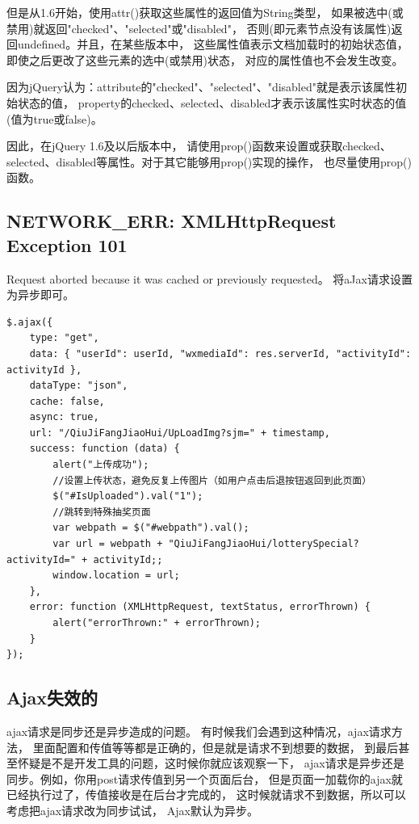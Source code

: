 \documentclass{book}
\begin{document}
但是从1.6开始，使用attr()获取这些属性的返回值为String类型，
如果被选中(或禁用)就返回"checked"、"selected"或"disabled"，
否则(即元素节点没有该属性)返回undefined。并且，在某些版本中，
这些属性值表示文档加载时的初始状态值，即使之后更改了这些元素的选中(或禁用)状态，
对应的属性值也不会发生改变。

因为jQuery认为：attribute的"checked"、"selected"、"disabled"就是表示该属性初始状态的值，
property的checked、selected、disabled才表示该属性实时状态的值(值为true或false)。

因此，在jQuery 1.6及以后版本中，
请使用prop()函数来设置或获取checked、selected、disabled等属性。对于其它能够用prop()实现的操作，
也尽量使用prop()函数。

\subsection{NETWORK\_ERR: XMLHttpRequest Exception 101}

Request aborted because it was cached or previously requested。
将aJax请求设置为异步即可。

\begin{lstlisting}[language=VBScript]
$.ajax({
	type: "get",
	data: { "userId": userId, "wxmediaId": res.serverId, "activityId": activityId },
	dataType: "json",
	cache: false,
	async: true,
	url: "/QiuJiFangJiaoHui/UpLoadImg?sjm=" + timestamp,
	success: function (data) {
		alert("上传成功");
		//设置上传状态，避免反复上传图片（如用户点击后退按钮返回到此页面）
		$("#IsUploaded").val("1");
		//跳转到特殊抽奖页面
		var webpath = $("#webpath").val();
		var url = webpath + "QiuJiFangJiaoHui/lotterySpecial?activityId=" + activityId;;
		window.location = url;
	},
	error: function (XMLHttpRequest, textStatus, errorThrown) {
		alert("errorThrown:" + errorThrown);
	}
});
\end{lstlisting}

\subsection{Ajax失效的}

ajax请求是同步还是异步造成的问题。
有时候我们会遇到这种情况，ajax请求方法，
里面配置和传值等等都是正确的，但是就是请求不到想要的数据，
到最后甚至怀疑是不是开发工具的问题，这时候你就应该观察一下，
ajax请求是异步还是同步。例如，你用post请求传值到另一个页面后台，
但是页面一加载你的ajax就已经执行过了，传值接收是在后台才完成的，
这时候就请求不到数据，所以可以考虑把ajax请求改为同步试试，
Ajax默认为异步。
\end{document}
